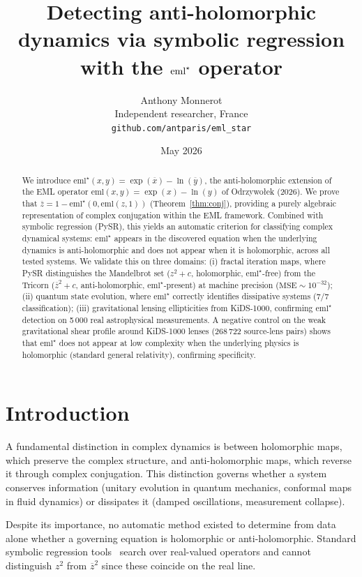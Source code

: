 \documentclass[12pt,a4paper]{article}
\title{Detecting anti-holomorphic dynamics via symbolic regression\\
with the $\emlstar$ operator}
\author{Anthony Monnerot\\
Independent researcher, France\\
\texttt{github.com/antparis/eml\_star}}
\date{May 2026}
\newcommand{\emlstar}{\mathrm{eml}^{\star}}
\newcommand{\eml}{\mathrm{eml}}
\newcommand{\conj}[1]{\overline{#1}}
\begin{document}
\maketitle

\begin{abstract}
We introduce $\emlstar(x,y) = \exp(\conj{x}) - \ln(\conj{y})$,
the anti-holomorphic extension of the EML operator
$\eml(x,y) = \exp(x) - \ln(y)$ of Odrzywołek (2026).
We prove that $\conj{z} = 1 - \emlstar(0, \eml(z,1))$
(Theorem~\ref{thm:conj}), providing a purely algebraic
representation of complex conjugation within the EML framework.
Combined with symbolic regression (PySR), this yields an automatic
criterion for classifying complex dynamical systems:
$\emlstar$ appears in the discovered equation when the underlying
dynamics is anti-holomorphic and does not appear when it is
holomorphic, across all tested systems.
We validate this on three domains: (i) fractal iteration maps,
where PySR distinguishes the Mandelbrot set ($z^2+c$, holomorphic,
$\emlstar$-free) from the Tricorn ($\conj{z}^2+c$, anti-holomorphic,
$\emlstar$-present) at machine precision ($\mathrm{MSE} \sim 10^{-32}$);
(ii) quantum state evolution, where $\emlstar$ correctly identifies
dissipative systems (7/7 classification);
(iii) gravitational lensing ellipticities from KiDS-1000,
confirming $\emlstar$ detection on 5\,000 real astrophysical
measurements.
A negative control on the weak gravitational shear profile around
KiDS-1000 lenses (268\,722 source-lens pairs) shows that $\emlstar$
does not appear at low complexity when the underlying physics is
holomorphic (standard general relativity), confirming specificity.
\end{abstract}


\section{Introduction}
\label{sec:intro}

A fundamental distinction in complex dynamics is between holomorphic
maps, which preserve the complex structure, and anti-holomorphic maps,
which reverse it through complex conjugation.
This distinction governs whether a system conserves information
(unitary evolution in quantum mechanics, conformal maps in fluid
dynamics) or dissipates it (damped oscillations, measurement collapse).

Despite its importance, no automatic method existed to determine
from data alone whether a governing equation is holomorphic or
anti-holomorphic.
Standard symbolic regression tools~\citep{cranmer2023pysr} search over
real-valued operators and cannot distinguish $z^2$ from $\conj{z}^2$
since these coincide on the real line.
\end{document}
